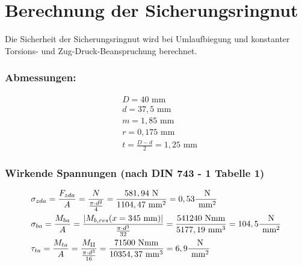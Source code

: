 \section{Berechnung der Sicherungsringnut}
Die Sicherheit der Sicherungsringnut wird bei Umlaufbiegung und konstanter Torsions- und Zug-Druck-Beanspruchung berechnet.
\subsubsection{Abmessungen:}
\begin{align*}
&D= 40 \text{ mm}  \\
&d= 37,5 \text{ mm}  \\
& m= 1,85 \text{ mm} \\
& r= 0,175 \text{ mm}\\
& t=\frac{D-d}{2} =1,25 \text{ mm} 
\end{align*}
\subsubsection{Wirkende Spannungen (nach DIN 743 - 1 Tabelle 1)}
\begin{align*}
&\sigma_{zda} = \frac{F_{zda}}{A} = \frac{N}{\frac{\pi \cdot d^2}{4}} = \frac{581,94 \text{ N}}{1104,47 \text{ mm}^2} = 0,53 \frac{\text{ N}}{\text{ mm}^2} \\
&\sigma_{ba} = \frac{M_{ba}}{A} = \frac{|M_{b,res}(x=345 \text{ mm}) |}{\frac{\pi \cdot d^3}{32}} = \frac{541240 \text{ Nmm}}{5177,19 \text{ mm}^3} = 104,5 \frac{\text{ N}}{\text{ mm}^2} \\
&\tau_{ta} = \frac{M_{ta}}{A} = \frac{M_{\mathrm{II}}}{\frac{\pi \cdot d^3}{16}} = \frac{71500 \text{ Nmm}}{10354,37 \text{ mm}^3} = 6,9 \frac{\text{ N}}{\text{ mm}^2} 
\end{align*}
